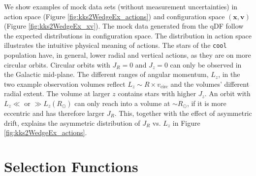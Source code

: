 \documentclass[iop,revtex4,numberedappendix,appendixfloats]{emulateapj}
\newcommand{\vect}[1]{\boldsymbol{#1}}
\begin{document}
We show examples of mock data sets (without measurement uncertainties) in action space (Figure \ref{fig:kks2WedgeEx_actions}) and configuration space $(\vect{x},\vect{v})$ (Figure \ref{fig:kks2WedgeEx_xv}). The mock data generated from the qDF follow the expected distributions in configuration space. The distribution in action space illustrates the intuitive physical meaning of actions. The stars of the \texttt{cool} population have, in general, lower radial and vertical actions, as they are on more circular orbits. Circular orbits with $J_R = 0$ and $J_z = 0$ can only be observed in the Galactic mid-plane. The different ranges of angular momentum, $L_z$, in the two example observation volumes reflect $L_z \sim R \times v_\text{circ}$ and the volumes' different radial extent. The volume at larger $z$ contains stars with higher $J_z$. An orbit with $L_z \ll$ or $\gg L_z(R_\odot)$ can only reach into a volume at $\sim R_\odot$, if it is more eccentric and has therefore larger $J_R$. This, together with the effect of asymmetric drift, explains the asymmetric distribution of $J_R$ vs. $L_z$ in Figure \ref{fig:kks2WedgeEx_actions}.

\section{Selection Functions} \label{app:selectionfunction}
\end{document}
